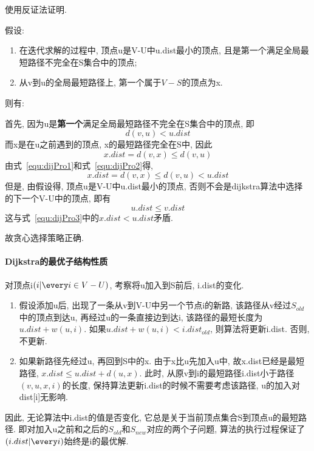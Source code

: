 使用反证法证明.\par

假设:
\begin{enumerate}
	\item 在迭代求解的过程中, 顶点u是V-U中u.dist最小的顶点,
	      且是第一个满足全局最短路径不完全在S集合中的顶点;
	\item 从v到u的全局最短路径上, 第一个属于$V-S$的顶点为x.
\end{enumerate}

则有:\par
首先, 因为u是\textbf{第一个}满足全局最短路径不完全在S集合中的顶点, 即
\begin{equation}
	d(v, u) < u.dist
	\label{equ:dijPro1}
\end{equation}
而x是在u之前遇到的顶点, x的最短路径完全在S中, 因此
\begin{equation}
	x.dist = d(v, x) \leq d(v, u)
	\label{equ:dijPro2}
\end{equation}
由式~\ref{equ:dijPro1}和式~\ref{equ:dijPro2}得,
\begin{equation}
	x.dist = d(v, x) \leq d(v, u) < u.dist
	\label{eq:dijPro3}
\end{equation}
但是, 由假设得, 顶点u是V-U中u.dist最小的顶点,
否则不会是dijkstra算法中选择的下一个V-U中的顶点, 即有
\begin{equation}
	u.dist \leq v.dist
\end{equation}
这与式~\ref{equ:dijPro3}中的$x.dist < u.dist$矛盾.\par
故贪心选择策略正确.

\paragraph{Dijkstra的最优子结构性质}
对顶点i$(i | \every i \in V-U)$, 考察将u加入到S前后, i.dist的变化.
\begin{enumerate}
	\item 假设添加u后, 出现了一条从v到V-U中另一个节点i的新路,
	      该路径从v经过$S_{old}$中的顶点到达u, 再经过u的一条直接边到达i,
	      该路径的最短长度为$u.dist + w(u, i)$. 如果$u.dist+w(u,i) <
		      i.dist_{old}$, 则算法将更新i.dist. 否则, 不更新.
	\item 如果新路径先经过u, 再回到S中的x. 由于x比u先加入u中,
	      故x.dist已经是最短路径, $x.dist \leq u.dist + d(u, x)$. 此时,
	      从原v到i的最短路径i.dist小于路径$(v,u,x,i)$的长度,
	      保持算法更新i.dist的时候不需要考虑该路径, u的加入对dist[i]无影响.
\end{enumerate}
因此, 无论算法中i.dist的值是否变化, 它总是关于当前顶点集合S到顶点u的最短路径.
即对加入u之前和之后的$S_{old}$和$S_{new}$对应的两个子问题,
算法的执行过程保证了$(i.dist | \every i)$始终是i的最优解.
